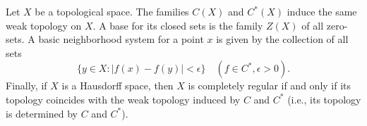 Let $X$ be a topological space. The families $C(X)$ and $C^*(X)$ induce the same weak topology on $X$. A base for its closed sets is the family $Z(X)$ of all zero-sets. A basic neighborhood system for a point $x$ is given by the collection of all sets
$$\{y \in X: |f(x) - f(y)| < \epsilon\} \quad (f \in C^*, \epsilon > 0).$$
Finally, if $X$ is a Hausdorff space, then $X$ is completely regular if and only if its topology coincides with the weak topology induced by $C$ and $C^*$ (i.e., its topology is determined by $C$ and $C^*$).
